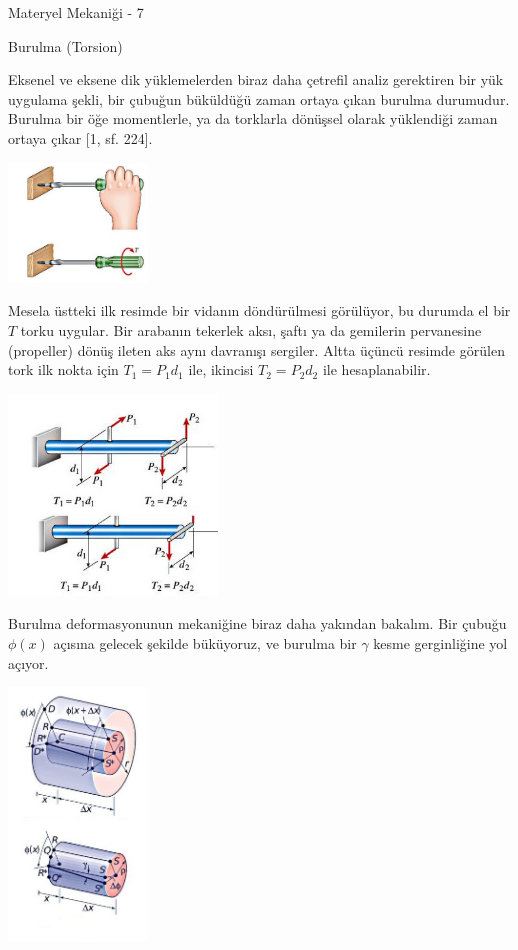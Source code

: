 \documentclass[12pt,fleqn]{article}\usepackage{../../common}
\begin{document}
Materyel Mekaniği - 7

Burulma (Torsion)

Eksenel ve eksene dik yüklemelerden biraz daha çetrefil analiz gerektiren bir
yük uygulama şekli, bir çubuğun büküldüğü zaman ortaya çıkan burulma durumudur.
Burulma bir öğe momentlerle, ya da torklarla dönüşsel olarak yüklendiği zaman
ortaya çıkar [1, sf. 224].

\includegraphics[width=10em]{phy_020_strs_06_01.jpg}

Mesela üstteki ilk resimde bir vidanın döndürülmesi görülüyor, bu durumda el bir
$T$ torku uygular. Bir arabanın tekerlek aksı, şaftı ya da gemilerin pervanesine
(propeller) dönüş ileten aks aynı davranışı sergiler.  Altta üçüncü resimde
görülen tork ilk nokta için $T_1 = P_1 d_1$ ile, ikincisi $T_2 = P_2 d_2$ ile
hesaplanabilir.

\includegraphics[width=15em]{phy_020_strs_06_02.jpg}

Burulma deformasyonunun mekaniğine biraz daha yakından bakalım. Bir çubuğu
$\phi(x)$ açısına gelecek şekilde büküyoruz, ve burulma bir $\gamma$ kesme
gerginliğine yol açıyor.

\includegraphics[width=10em]{phy_020_strs_06_03.jpg}
\end{document}
